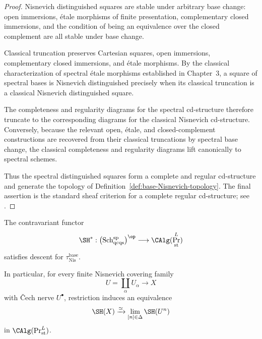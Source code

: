 \begin{proof}
Nisnevich distinguished squares are stable under arbitrary base change:
open immersions, étale morphisms of finite presentation, complementary
closed immersions, and the condition of being an equivalence over the closed
complement are all stable under base change.

Classical truncation preserves Cartesian squares, open immersions,
complementary closed immersions, and étale morphisms.  By the classical
characterization of spectral étale morphisms established in Chapter~3, a
square of spectral bases is Nisnevich distinguished precisely when its
classical truncation is a classical Nisnevich distinguished square.

The completeness and regularity diagrams for the spectral cd-structure
therefore truncate to the corresponding diagrams for the classical
Nisnevich cd-structure.  Conversely, because the relevant open, étale, and
closed-complement constructions are recovered from their classical
truncations by spectral base change, the classical completeness and
regularity diagrams lift canonically to spectral schemes.

Thus the spectral distinguished squares form a complete and regular
cd-structure and generate the topology of
Definition~\ref{def:base-Nisnevich-topology}.  The final assertion is the
standard sheaf criterion for a complete regular cd-structure; see
\cite{VoevodskyCdStructures}.
\end{proof}

\begin{theorem}
\label{thm:SH-Nis-descent}
The contravariant functor
\[
    \SH^*:
    \bigl(
      \operatorname{Sch}^{\mathrm{sp}}_{\mathrm{qcqs}}
    \bigr)^{\op}
    \longrightarrow
    \CAlg(\Pr^L_{\mathrm{st}})
\]
satisfies descent for
\(\tau_{\mathrm{Nis}}^{\mathrm{base}}\).

In particular, for every finite Nisnevich covering family
\[
    U=\coprod_\alpha U_\alpha
    \longrightarrow
    X
\]
with \v{C}ech nerve \(U^\bullet\), restriction induces an equivalence
\[
    \SH(X)
    \xrightarrow{\simeq}
    \lim_{[n]\in\Delta}
    \SH(U^n)
\]
in \(\CAlg(\Pr^L_{\mathrm{st}})\).
\end{theorem}

